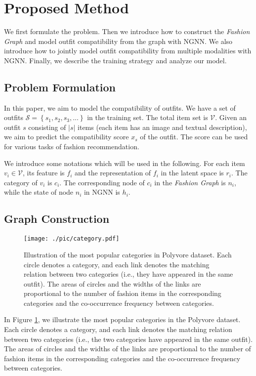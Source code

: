 \documentclass[sigconf]{acmart}
\begin{document}
\section{Proposed Method}
We first formulate the problem. Then we introduce how to construct the \emph{Fashion Graph} and model outfit compatibility from the graph with NGNN. We also introduce how to jointly model outfit compatibility from multiple modalities with NGNN. Finally, we describe the training strategy and analyze our model.


\subsection{Problem Formulation}
In this paper, we aim to model the compatibility of outfits.
We have a set of outfits $\mathcal{S} = \left \{s_{1}, s_{2}, s_{3}, ... \right \}$ in the training set. The total item set is $\mathcal{V}$.
Given an outfit $s$ consisting of $\left | s \right |$ items (each item has an image and textual description), we aim to predict the compatibility score $x_{s}$ of the outfit. The score can be used for various tasks of fashion recommendation.

We introduce some notations which will be used in the following.
For each item $v_{i} \in \mathcal{V}$, its feature is $f_{i}$ and the  representation of $f_{i}$ in the latent space is $r_{i}$. The category of $v_{i}$ is $c_{i}$. The corresponding node of $c_{i}$ in the \emph{Fashion Graph} is $n_{i}$, while the state of node $n_{i}$ in NGNN is $h_{i}$.



\subsection{Graph Construction} \label{sect:gi}
\begin{figure}[t]
\centering
\texttt{[image: ./pic/category.pdf]}
\caption{
Illustration of the most popular categories in Polyvore dataset. Each circle denotes a category, and each link denotes the matching relation between two categories (i.e., they have appeared in the same outfit).
The areas of circles and the widths of the links are proportional to the number of fashion items in the corresponding categories and the co-occurrence frequency between categories.
}
\label{fig:dataset_category}
\end{figure}

In Figure \ref{fig:dataset_category}, we illustrate the most popular categories in the Polyvore dataset. Each circle denotes a category, and each link denotes the matching relation between two categories (i.e., the two categories have appeared in the same outfit).
The areas of circles and the widths of the links are proportional to the number of fashion items in the corresponding categories and the co-occurrence frequency between categories.
\end{document}
